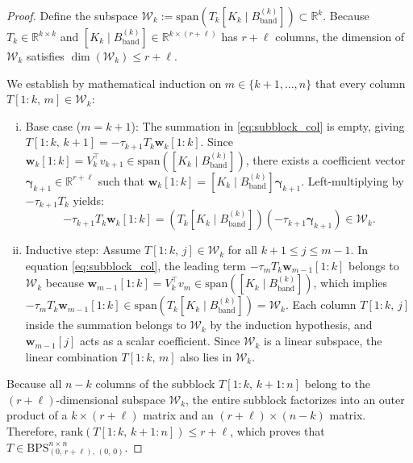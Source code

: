\documentclass[a4paper,fleqn]{cas-sc}
\begin{document}
\begin{proof}
Define the subspace $\mathcal{W}_k := \text{span}\left( T_k [K_k \mid B_{\text{band}}^{(k)}] \right) \subset \mathbb{R}^k$. Because $T_k \in \mathbb{R}^{k \times k}$ and $[K_k \mid B_{\text{band}}^{(k)}] \in \mathbb{R}^{k \times (r+\ell)}$ has $r+\ell$ columns, the dimension of $\mathcal{W}_k$ satisfies $\dim(\mathcal{W}_k) \le r + \ell$.

We establish by mathematical induction on $m \in \{k+1, \dots, n\}$ that every column $T[1:k, \, m] \in \mathcal{W}_k$:
\begin{enumerate}[(i)]
    \item Base case ($m = k+1$): The summation in \eqref{eq:subblock_col} is empty, giving $T[1:k, \, k+1] = -\tau_{k+1} T_k \mathbf{w}_k[1:k]$. Since $\mathbf{w}_k[1:k] = V_k^\top v_{k+1} \in \text{span}([K_k \mid B_{\text{band}}^{(k)}])$, there exists a coefficient vector $\boldsymbol{\gamma}_{k+1} \in \mathbb{R}^{r+\ell}$ such that $\mathbf{w}_k[1:k] = [K_k \mid B_{\text{band}}^{(k)}] \boldsymbol{\gamma}_{k+1}$. Left-multiplying by $-\tau_{k+1} T_k$ yields:
    \[
    -\tau_{k+1} T_k \mathbf{w}_k[1:k] = \left( T_k [K_k \mid B_{\text{band}}^{(k)}] \right) \left(-\tau_{k+1} \boldsymbol{\gamma}_{k+1}\right) \in \mathcal{W}_k.
    \]
    \item Inductive step: Assume $T[1:k, \, j] \in \mathcal{W}_k$ for all $k+1 \le j \le m-1$. In equation \eqref{eq:subblock_col}, the leading term $-\tau_m T_k \mathbf{w}_{m-1}[1:k]$ belongs to $\mathcal{W}_k$ because $\mathbf{w}_{m-1}[1:k] = V_k^\top v_m \in \text{span}([K_k \mid B_{\text{band}}^{(k)}])$, which implies $-\tau_m T_k \mathbf{w}_{m-1}[1:k] \in \text{span}\left(T_k [K_k \mid B_{\text{band}}^{(k)}]\right) = \mathcal{W}_k$. Each column $T[1:k, \, j]$ inside the summation belongs to $\mathcal{W}_k$ by the induction hypothesis, and $\mathbf{w}_{m-1}[j]$ acts as a scalar coefficient. Since $\mathcal{W}_k$ is a linear subspace, the linear combination $T[1:k, \, m]$ also lies in $\mathcal{W}_k$.
\end{enumerate}

Because all $n-k$ columns of the subblock $T[1:k, \, k+1:n]$ belong to the $(r+\ell)$-dimensional subspace $\mathcal{W}_k$, the entire subblock factorizes into an outer product of a $k \times (r+\ell)$ matrix and an $(r+\ell) \times (n-k)$ matrix. Therefore, $\mathrm{rank}\left(T[1:k, \, k+1:n]\right) \le r + \ell$, which proves that $T \in \mathrm{BPS}_{(0, \, r+\ell), \, (0, \, 0)}^{n \times n}$.
\end{proof}
\end{document}
